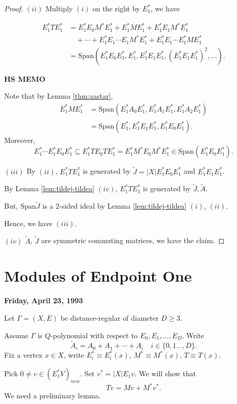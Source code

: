 \documentclass[
]{book}
\theoremstyle{definition}
\theoremstyle{definition}
\theoremstyle{definition}
\theoremstyle{definition}
\theoremstyle{remark}
\begin{document}
\begin{proof}
\((ii)\) Multiply \((i)\) on the right by \(E^*_1\), we have

\begin{align}
E^*_1TE^*_1 & = E^*_1E_0M^*E^*_1 + E^*_1ME^*_1 + E^*_1E_1M^*E^*_1\\
& \quad + \cdots + E^*_1E_1\cdots E_1M^*E^*_1 + E^*_1E_1\cdots E^*_1ME^*_1\\
& = \mathrm{Span}(E^*_1E_0E^*_1, E^*_1, E^*_1E_1E^*_1, (E^*_1E_1E^*_1)^2, \ldots).
\end{align}

\textbf{HS MEMO}

Note that by Lemma \ref{thm:aastar},
\begin{align}
E^*_1ME^*_1 & = \mathrm{Span}(E^*_1A_0E^*_1, E^*_1A_1E^*_1, E^*_1A_2E^*_1)\\
& = \mathrm{Span}(E^*_1, E^*_1E_1E^*_1, E^*_1E_0E^*_1).
\end{align}
Moreover,
\[E^*_1\cdots E^*_1E_0E^*_1 \subseteq E^*_1TE_0TE^*_1 = E^*_1M^*E_0M^*E^*_1 \in \mathrm{Span}(E^*_1E_0E^*_1).\]

\((iii)\) By \((ii)\), \(E^*_1TE^*_1\) is generated by \(\tilde{J} = |X|E^*_1E_0E^*_1\) and \(E^*_1E_1E^*_1\).

By Lemma \ref{lem:tildej-tildea} \((iv)\), \(E^*_1TE^*_1\) is generated by \(\tilde{J}, \tilde{A}\).

But, \(\mathrm{Span}{\tilde{J}}\) is a \(2\)-sided ideal by Lemma \ref{lem:tildej-tildea} \((i)\), \((ii)\).

Hence, we have \((iii)\).

\((iv)\) \(\tilde{A}\), \(\tilde{J}\) are symmetric commuting matrices, we have the claim.

\end{proof}

\hypertarget{lec34}{%
\chapter{Modules of Endpoint One}\label{lec34}}

\textbf{Friday, April 23, 1993}

Let \(\Gamma = (X,E)\) be distance-regular of diameter \(D\geq 3\).

Assume \(\Gamma\) is \(Q\)-polynomial with respect to \(E_0, E_1, \ldots, E_D\). Write
\[\tilde{A}_i = A_0 + A_1 + \cdots + A_i \quad i\in \{0, 1\ldots, D\}.\]
Fix a vertex \(x\in X\), write \(E^*_i \equiv E^*_i(x)\), \(M^* \equiv M^*(x)\), \(T\equiv T(x)\).

Pick \(0\neq v\in (E^*_1V)_{new}\). Set \(v^* = |X|E_1v\). We will show that
\[Tv = Mv + M^*v^*.\]
We need a preliminary lemma.
\end{document}
